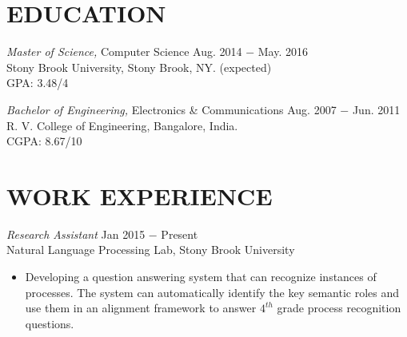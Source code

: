 \documentclass[margin, 2pt]{res} %
\begin{document}
\begin{resume}

 



\section{EDUCATION}

{\sl Master of Science,} Computer Science \hfill Aug. 2014 $-$ May. 2016\\
Stony Brook University, Stony Brook, NY. \hfill (expected)\\
GPA: 3.48/4

{\sl Bachelor of Engineering,} Electronics \& Communications \hfill Aug. 2007 $-$ Jun. 2011\\
R. V. College of Engineering, Bangalore, India.\\
CGPA: 8.67/10
 
 
\section{WORK EXPERIENCE}

{\sl Research Assistant} \hfill Jan 2015 $-$ Present \\
Natural Language Processing Lab, Stony Brook University

\begin{itemize} \itemsep -2pt %
  \item Developing a question answering system that can recognize instances of processes. The system can automatically identify the key semantic roles and use them in an alignment framework to answer $4^{th}$ grade process recognition questions.
\end{itemize}



\end{resume}
\end{document}
